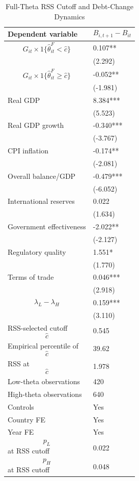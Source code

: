 \begin{table}[H]\centering
\begin{threeparttable}
\caption{Full-Theta RSS Cutoff and Debt-Change Dynamics}
\label{tab:deltaB_rss_cutoff_fulltheta}
\scriptsize
\begin{tabularx}{\textwidth}{lY}
\toprule
Dependent variable & $$B_{i,t+1}-B_{it}$$ \\
\midrule
$$G_{it}\times 1\{\widehat{\theta}^{F}_{it}<\widehat{c}\}$$ & 0.107** \\
 & (2.292) \\
$$G_{it}\times 1\{\widehat{\theta}^{F}_{it}\geq\widehat{c}\}$$ & -0.052** \\
 & (-1.981) \\
Real GDP & 8.384*** \\
 & (5.523) \\
Real GDP growth & -0.340*** \\
 & (-3.767) \\
CPI inflation & -0.174** \\
 & (-2.081) \\
Overall balance/GDP & -0.479*** \\
 & (-6.052) \\
International reserves & 0.022 \\
 & (1.634) \\
Government effectiveness & -2.022** \\
 & (-2.127) \\
Regulatory quality & 1.551* \\
 & (1.770) \\
Terms of trade & 0.046*** \\
 & (2.918) \\
$$\lambda_L-\lambda_H$$ & 0.159*** \\
 & (3.110) \\
\midrule
RSS-selected cutoff $$\widehat{c}$$ & 0.545 \\
Empirical percentile of $$\widehat{c}$$ & 39.62 \\
RSS at $$\widehat{c}$$ & 1.978 \\
Low-theta observations & 420 \\
High-theta observations & 640 \\
Controls & Yes \\
Country FE & Yes \\
Year FE & Yes \\
$$p_L$$ at RSS cutoff & 0.022 \\
$$p_H$$ at RSS cutoff & 0.048 \\

\end{tabularx}
\end{threeparttable}
\end{table}
